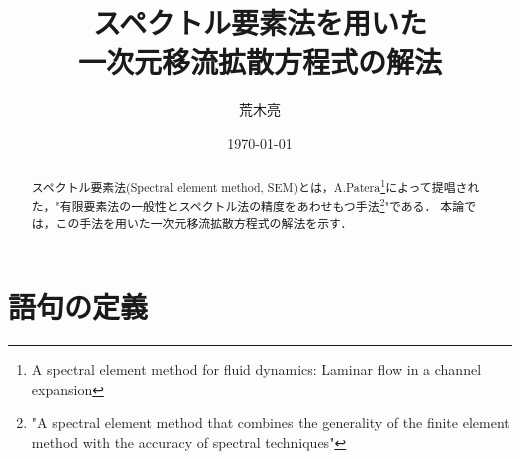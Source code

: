 \documentclass[12pt,a4paper]{jsarticle}
\title{スペクトル要素法を用いた\\一次元移流拡散方程式の解法}
\author{荒木亮}
\date{\today}
\begin{document}
\maketitle
\begin{abstract}
  スペクトル要素法(Spectral element method, SEM)とは，A.Patera\footnote{A spectral element method for fluid dynamics: Laminar flow in a channel expansion}によって提唱された，"有限要素法の一般性とスペクトル法の精度をあわせもつ手法\footnote{"A spectral element method that combines the generality of the finite element method with
  the accuracy of spectral techniques"}"である．
  本論では，この手法を用いた一次元移流拡散方程式の解法を示す．
\end{abstract}

\section{語句の定義}
\end{document}
